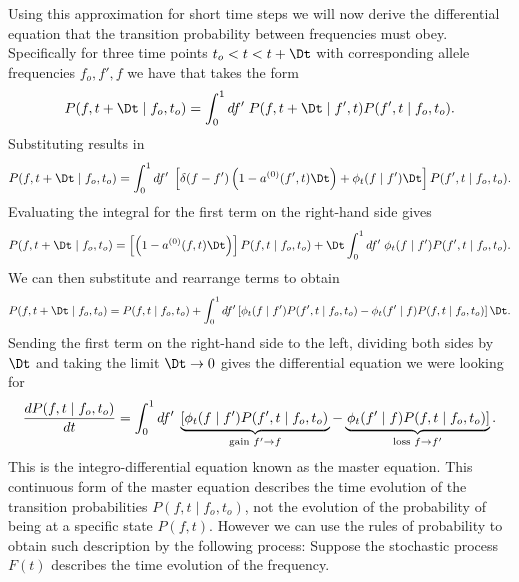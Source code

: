 Using this approximation for short time steps we will now derive the
differential equation that the transition probability between frequencies must
obey. Specifically for three time points $t_o < t < t + \Dt$ with corresponding
allele frequencies $f_o, f', f$ we have that  takes the
form
\begin{equation}
  P(f, t + \Dt \mid f_o, t_o) = \int_0^1 df' \; P(f, t + \Dt \mid f', t)
  P(f', t \mid f_o, t_o).
\end{equation}
Substituting  results in
\begin{equation}
  P(f, t + \Dt \mid f_o, t_o) = \int_0^1 df' \;
  \left[ \delta(f - f') \left( 1 - a^{(0)}(f', t)\Dt \right)
  + \phi_t(f \mid f')\Dt \right]
  P(f', t \mid f_o, t_o).
\end{equation}
Evaluating the integral for the first term on the right-hand side gives
\begin{equation}
  P(f, t + \Dt \mid f_o, t_o) = \left[\left( 1 - a^{(0)}(f, t)\Dt \right)\right]
  P(f, t \mid f_o, t_o) +
  \Dt \int_0^1 df' \; \phi_t(f \mid f') P(f', t \mid f_o, t_o).
\end{equation}
We can then substitute  and rearrange terms to obtain
\begin{equation}
  P(f, t + \Dt \mid f_o, t_o) = P(f, t \mid f_o, t_o)
  + \int_0^1 df' \left[ \phi_t(f \mid f') P(f', t \mid f_o, t_o) -
  \phi_t(f' \mid f) P(f, t \mid f_o, t_o) \right]\Dt.
\end{equation}
Sending the first term on the right-hand side to the left, dividing both sides
by $\Dt$ and taking the limit $\Dt \rightarrow 0$ gives the differential
equation we were looking for
\begin{equation}
  {d{P(f, t \mid f_o, t_o)} \over dt} = \int_0^1 df' \;
  \underbrace{
  \left[ \phi_t(f \mid f') P(f', t \mid f_o, t_o) \right.}
  _{\text{gain } f' \rightarrow f}  -
  \underbrace{
  \left. \phi_t(f' \mid f) P(f, t \mid f_o, t_o) \right]}
  _{\text{loss } f \rightarrow f'}.
  \label{eq_master_eq_trans}
\end{equation}
This is the integro-differential equation known as the master equation. This
continuous form of the master equation describes the time evolution of the
transition probabilities $P(f, t \mid f_o, t_o)$, not the evolution of the
probability of being at a specific state $P(f, t)$. However we can use the rules
of probability to obtain such description by the following process: Suppose the
stochastic process $F(t)$ describes the time evolution of the frequency.
